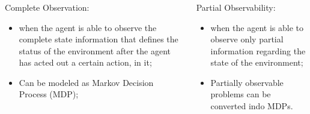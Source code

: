 \begin{frame}

    \frametitle{}

    \begin{columns}
        \begin{column}{0.5\textwidth}
            Complete Observation:
            \begin{itemize}
                \item when the agent is able to observe the complete state 
                information that defines the status of the environment 
                after the agent has acted out a certain action, in it;

                \item Can be modeled as Markov Decision Process (MDP);
               
            \end{itemize}

        \end{column}

        \begin{column}{0.5\textwidth}
            Partial Observability:
            \begin{itemize}
                \item when the agent is able to observe only partial 
                information regarding the state of the environment;

                \item Partially observable problems can be converted indo MDPs.
               
            \end{itemize}
        \end{column}

    \end{columns}

\end{frame}



